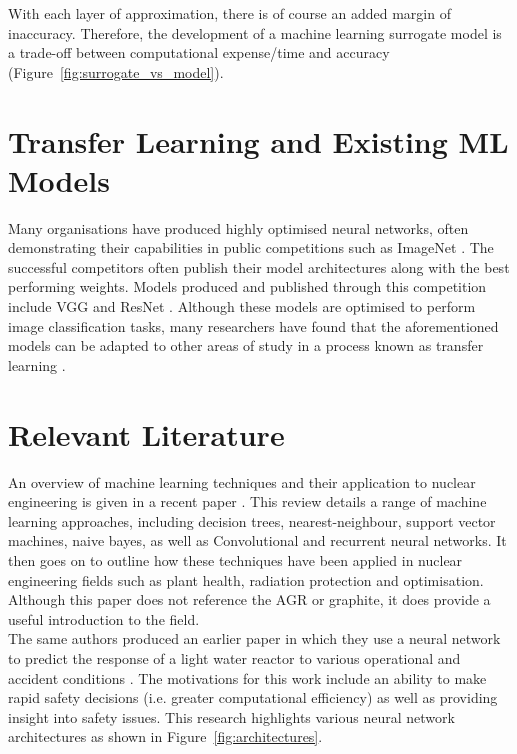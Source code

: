 \noindent With each layer of approximation, there is of course an added margin of inaccuracy. Therefore, the development of a machine learning surrogate model is a trade-off between computational expense/time and accuracy (Figure~\ref{fig:surrogate_vs_model}).

\section{Transfer Learning and Existing ML Models} \label{transfer}

Many organisations have produced highly optimised neural networks, often demonstrating their capabilities in public competitions such as ImageNet \cite{russakovsky2015imagenet}. The successful competitors often publish their model architectures along with the best performing weights. Models produced and published through this competition include VGG \cite{simonyan2014very} and ResNet \cite{he2015deep}. Although these models are optimised to perform image classification tasks, many researchers have found that the aforementioned models can be adapted to other areas of study in a process known as transfer learning \cite{tan2018survey}.

\section{Relevant Literature}

An overview of machine learning techniques and their application to nuclear engineering is given in a recent paper \cite{gomez2020status}. This review details a range of machine learning approaches, including decision trees, nearest-neighbour, support vector machines, naive bayes, as well as Convolutional and recurrent neural networks. It then goes on to outline how these techniques have been applied in nuclear engineering fields such as plant health, radiation protection and optimisation. Although this paper does not reference the AGR or graphite, it does provide a useful introduction to the field. 
\\

\noindent
The same authors produced an earlier paper in which they use a neural network to predict the response of a light water reactor to various operational and accident conditions \cite{fernandez2017nuclear}. The motivations for this work include an ability to make rapid safety decisions (i.e. greater computational efficiency) as well as providing insight into safety issues. This research highlights various neural network architectures as shown in Figure~\ref{fig:architectures}.  
\\

